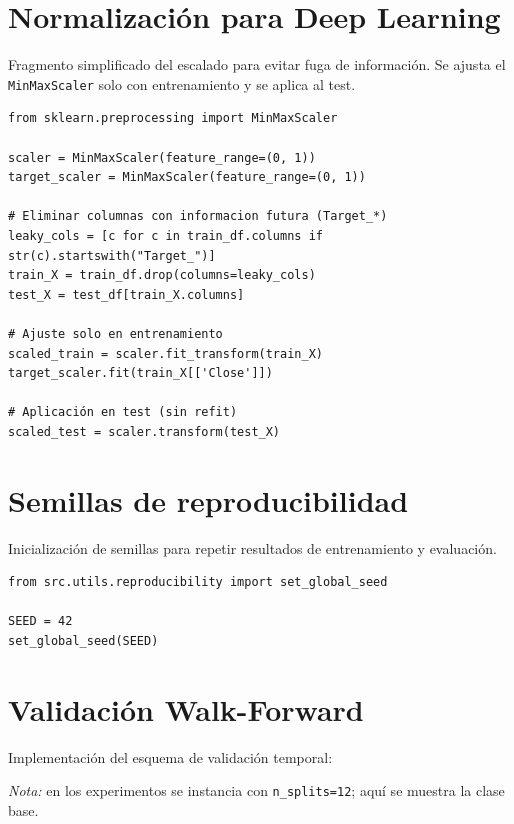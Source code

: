 \section{Normalización para Deep Learning}

Fragmento simplificado del escalado para evitar fuga de información. Se ajusta
el \texttt{MinMaxScaler} solo con entrenamiento y se aplica al test.

\begin{lstlisting}[frame=single, caption={Escalado sin fuga de información}]
from sklearn.preprocessing import MinMaxScaler

scaler = MinMaxScaler(feature_range=(0, 1))
target_scaler = MinMaxScaler(feature_range=(0, 1))

# Eliminar columnas con informacion futura (Target_*)
leaky_cols = [c for c in train_df.columns if str(c).startswith("Target_")]
train_X = train_df.drop(columns=leaky_cols)
test_X = test_df[train_X.columns]

# Ajuste solo en entrenamiento
scaled_train = scaler.fit_transform(train_X)
target_scaler.fit(train_X[['Close']])

# Aplicación en test (sin refit)
scaled_test = scaler.transform(test_X)
\end{lstlisting}

\section{Semillas de reproducibilidad}

Inicialización de semillas para repetir resultados de entrenamiento y evaluación.

\begin{lstlisting}[frame=single, caption={Semillas y determinismo}]
from src.utils.reproducibility import set_global_seed

SEED = 42
set_global_seed(SEED)
\end{lstlisting}

\section{Validación Walk-Forward}

Implementación del esquema de validación temporal:

\textit{Nota:} en los experimentos se instancia con \texttt{n\_splits=12}; aquí se muestra la clase base.

